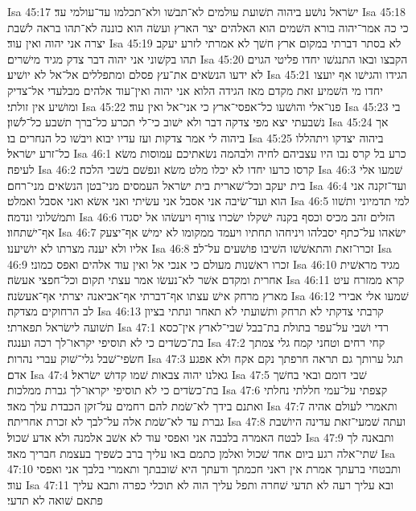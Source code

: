 Isa 45:17  ישׂראל נושׁע ביהוה תשׁועת עולמים לא־תבשׁו ולא־תכלמו עד־עולמי עד׃
Isa 45:18  כי כה אמר־יהוה בורא השׁמים הוא האלהים יצר הארץ ועשׂה הוא כוננה לא־תהו בראה לשׁבת יצרה אני יהוה ואין עוד׃
Isa 45:19  לא בסתר דברתי במקום ארץ חשׁך לא אמרתי לזרע יעקב תהו בקשׁוני אני יהוה דבר צדק מגיד מישׁרים׃
Isa 45:20  הקבצו ובאו התנגשׁו יחדו פליטי הגוים לא ידעו הנשׂאים את־עץ פסלם ומתפללים אל־אל לא יושׁיע׃
Isa 45:21  הגידו והגישׁו אף יועצו יחדו מי השׁמיע זאת מקדם מאז הגידה הלוא אני יהוה ואין־עוד אלהים מבלעדי אל־צדיק ומושׁיע אין זולתי׃
Isa 45:22  פנו־אלי והושׁעו כל־אפסי־ארץ כי אני־אל ואין עוד׃
Isa 45:23  בי נשׁבעתי יצא מפי צדקה דבר ולא ישׁוב כי־לי תכרע כל־ברך תשׁבע כל־לשׁון׃
Isa 45:24  אך ביהוה לי אמר צדקות ועז עדיו יבוא ויבשׁו כל הנחרים בו׃
Isa 45:25  ביהוה יצדקו ויתהללו כל־זרע ישׂראל׃
Isa 46:1  כרע בל קרס נבו היו עצביהם לחיה ולבהמה נשׂאתיכם עמוסות משׂא לעיפה׃
Isa 46:2  קרסו כרעו יחדו לא יכלו מלט משׂא ונפשׁם בשׁבי הלכה׃
Isa 46:3  שׁמעו אלי בית יעקב וכל־שׁארית בית ישׂראל העמסים מני־בטן הנשׂאים מני־רחם׃
Isa 46:4  ועד־זקנה אני הוא ועד־שׂיבה אני אסבל אני עשׂיתי ואני אשׂא ואני אסבל ואמלט׃
Isa 46:5  למי תדמיוני ותשׁוו ותמשׁלוני ונדמה׃
Isa 46:6  הזלים זהב מכיס וכסף בקנה ישׁקלו ישׂכרו צורף ויעשׂהו אל יסגדו אף־ישׁתחוו׃
Isa 46:7  ישׂאהו על־כתף יסבלהו ויניחהו תחתיו ויעמד ממקומו לא ימישׁ אף־יצעק אליו ולא יענה מצרתו לא יושׁיענו׃
Isa 46:8  זכרו־זאת והתאשׁשׁו השׁיבו פושׁעים על־לב׃
Isa 46:9  זכרו ראשׁנות מעולם כי אנכי אל ואין עוד אלהים ואפס כמוני׃
Isa 46:10  מגיד מראשׁית אחרית ומקדם אשׁר לא־נעשׂו אמר עצתי תקום וכל־חפצי אעשׂה׃
Isa 46:11  קרא ממזרח עיט מארץ מרחק אישׁ עצתו אף־דברתי אף־אביאנה יצרתי אף־אעשׂנה׃
Isa 46:12  שׁמעו אלי אבירי לב הרחוקים מצדקה׃
Isa 46:13  קרבתי צדקתי לא תרחק ותשׁועתי לא תאחר ונתתי בציון תשׁועה לישׂראל תפארתי׃
Isa 47:1  רדי ושׁבי על־עפר בתולת בת־בבל שׁבי־לארץ אין־כסא בת־כשׂדים כי לא תוסיפי יקראו־לך רכה וענגה׃
Isa 47:2  קחי רחים וטחני קמח גלי צמתך חשׂפי־שׁבל גלי־שׁוק עברי נהרות׃
Isa 47:3  תגל ערותך גם תראה חרפתך נקם אקח ולא אפגע אדם׃
Isa 47:4  גאלנו יהוה צבאות שׁמו קדושׁ ישׂראל׃
Isa 47:5  שׁבי דומם ובאי בחשׁך בת־כשׂדים כי לא תוסיפי יקראו־לך גברת ממלכות׃
Isa 47:6  קצפתי על־עמי חללתי נחלתי ואתנם בידך לא־שׂמת להם רחמים על־זקן הכבדת עלך מאד׃
Isa 47:7  ותאמרי לעולם אהיה גברת עד לא־שׂמת אלה על־לבך לא זכרת אחריתה׃
Isa 47:8  ועתה שׁמעי־זאת עדינה היושׁבת לבטח האמרה בלבבה אני ואפסי עוד לא אשׁב אלמנה ולא אדע שׁכול׃
Isa 47:9  ותבאנה לך שׁתי־אלה רגע ביום אחד שׁכול ואלמן כתמם באו עליך ברב כשׁפיך בעצמת חבריך מאד׃
Isa 47:10  ותבטחי ברעתך אמרת אין ראני חכמתך ודעתך היא שׁובבתך ותאמרי בלבך אני ואפסי עוד׃
Isa 47:11  ובא עליך רעה לא תדעי שׁחרה ותפל עליך הוה לא תוכלי כפרה ותבא עליך פתאם שׁואה לא תדעי׃
